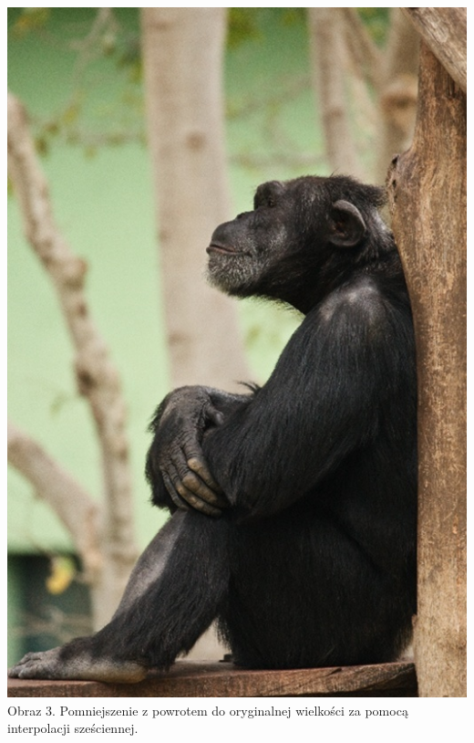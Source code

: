 \documentclass[14pt]{article}
\begin{document}
\begin{center}
\begin{minipage}{7cm}
\begin{center}
            \includegraphics[scale=0.2]{images/5x_BACK_TO_ORG_bc.jpg}
            \\ \small Obraz 3. Pomniejszenie z powrotem do oryginalnej wielkości za pomocą 
            interpolacji sześciennej. 
      \end{center}
    \end{minipage}





\end{center}
\end{document}

